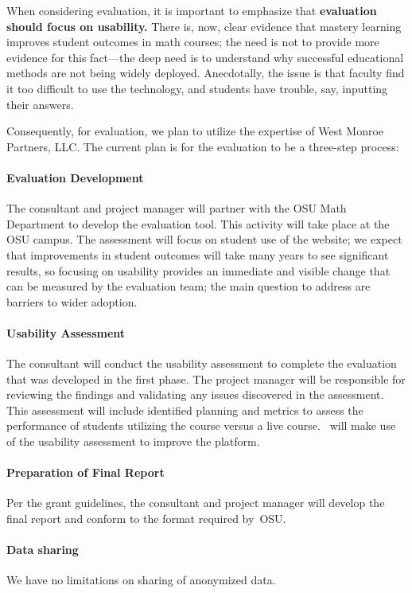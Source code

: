 When considering evaluation, it is important to emphasize that
\textbf{evaluation should focus on usability.}  There is, now, clear
evidence that mastery learning improves student outcomes in math
courses; the need is not to provide more evidence for this fact---the
deep need is to understand why successful educational methods are not
being widely deployed.  Anecdotally, the issue is that faculty find it
too difficult to use the technology, and students have trouble, say,
inputting their answers.

Consequently, for evaluation, we plan to utilize the expertise of West Monroe
Partners, LLC. The current plan is for the evaluation to be a three-step process:
\paragraph{Evaluation Development} The consultant and project
  manager will partner with the OSU Math Department to develop the
  evaluation tool.  This activity will take place at the OSU campus.  The assessment will focus on student use of the website; we expect that improvements in student outcomes will take many years to see significant results, so focusing on usability provides an immediate and visible change that can be measured by the evaluation team; the main question to address are barriers to wider adoption.
\paragraph{Usability Assessment} The consultant will conduct the usability
  assessment to complete the evaluation that was developed in the
  first phase.  The project manager will be responsible for reviewing
  the findings and validating any issues discovered in the assessment.
  This assessment will include identified planning and metrics to
  assess the performance of students utilizing the course versus a
  live course.  \gratisu\ will make use of the usability assessment to improve the platform.
\paragraph{Preparation of Final Report} Per the grant guidelines, the
  consultant and project manager will develop the final report and
  conform to the format required by~OSU.

\paragraph{Data sharing} We have no limitations on sharing of anonymized data.
